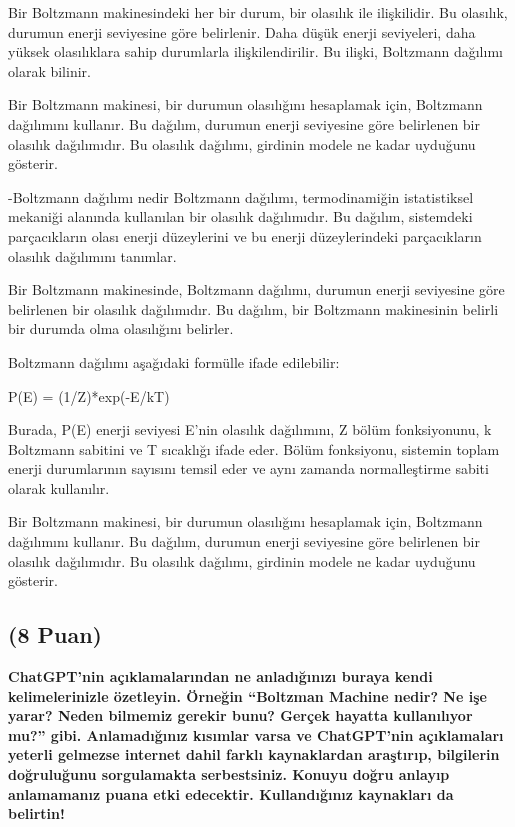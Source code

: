 \documentclass[11pt]{article}
\begin{document}
Bir Boltzmann makinesindeki her bir durum, bir olasılık ile ilişkilidir. Bu olasılık, durumun enerji seviyesine göre belirlenir. Daha düşük enerji seviyeleri, daha yüksek olasılıklara sahip durumlarla ilişkilendirilir. Bu ilişki, Boltzmann dağılımı olarak bilinir.

Bir Boltzmann makinesi, bir durumun olasılığını hesaplamak için, Boltzmann dağılımını kullanır. Bu dağılım, durumun enerji seviyesine göre belirlenen bir olasılık dağılımıdır. Bu olasılık dağılımı, girdinin modele ne kadar uyduğunu gösterir.

-Boltzmann dağılımı nedir
Boltzmann dağılımı, termodinamiğin istatistiksel mekaniği alanında kullanılan bir olasılık dağılımıdır. Bu dağılım, sistemdeki parçacıkların olası enerji düzeylerini ve bu enerji düzeylerindeki parçacıkların olasılık dağılımını tanımlar.

Bir Boltzmann makinesinde, Boltzmann dağılımı, durumun enerji seviyesine göre belirlenen bir olasılık dağılımıdır. Bu dağılım, bir Boltzmann makinesinin belirli bir durumda olma olasılığını belirler.

Boltzmann dağılımı aşağıdaki formülle ifade edilebilir:

P(E) = (1/Z)*exp(-E/kT)

Burada, P(E) enerji seviyesi E'nin olasılık dağılımını, Z bölüm fonksiyonunu, k Boltzmann sabitini ve T sıcaklığı ifade eder. Bölüm fonksiyonu, sistemin toplam enerji durumlarının sayısını temsil eder ve aynı zamanda normalleştirme sabiti olarak kullanılır.

Bir Boltzmann makinesi, bir durumun olasılığını hesaplamak için, Boltzmann dağılımını kullanır. Bu dağılım, durumun enerji seviyesine göre belirlenen bir olasılık dağılımıdır. Bu olasılık dağılımı, girdinin modele ne kadar uyduğunu gösterir.

\subsection{(8 Puan)} \textbf{ChatGPT’nin açıklamalarından ne anladığınızı buraya kendi kelimelerinizle özetleyin. Örneğin ``Boltzman Machine nedir? Ne işe yarar? Neden bilmemiz gerekir bunu? Gerçek hayatta kullanılıyor mu?'' gibi. Anlamadığınız kısımlar varsa ve ChatGPT’nin açıklamaları yeterli gelmezse internet dahil farklı kaynaklardan araştırıp, bilgilerin doğruluğunu sorgulamakta serbestsiniz. Konuyu doğru anlayıp anlamamanız puana etki edecektir. Kullandığınız kaynakları da belirtin!}
\end{document}
